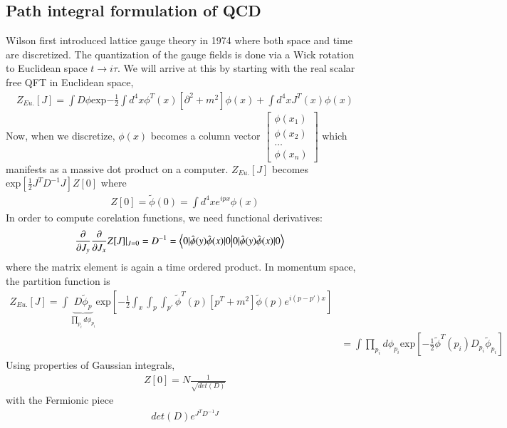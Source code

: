 \subsection{Path integral formulation of QCD}
Wilson \cite{Wilson:1974sk} first introduced lattice gauge theory in 1974 where both space and time are discretized. The quantization of the gauge fields is done via a Wick rotation to Euclidean space $t\rightarrow i\tau$. We will arrive at this by starting with the real scalar free QFT in Euclidean space,
\begin{align}
    Z_{Eu.}[J] = \int D\phi \text{exp}{-\frac{1}{2} \int d^4x \phi^T(x)[\partial^2 +m^2] \phi(x) + \int d^4xJ^T(x)\phi(x)} 
\end{align}  
Now, when we discretize, $\phi(x)$ becomes a column vector 
$\begin{bmatrix}
    \phi(x_1) \\
    \phi(x_2) \\
    \dots \\
    \phi(x_n)
\end{bmatrix} $
which manifests as a massive dot product on a computer. 
$Z_{Eu.}[J]$ becomes $\text{exp}[\frac{1}{2}J^T D^{-1}J] Z[0]$ where
\begin{align}
    Z[0] = \tilde{\phi}(0) = \int d^4x e^{ipx} \phi(x)
\end{align}
In order to compute corelation functions, we need functional derivatives: 
\begin{align}
    \frac{\partial}{\partial J_y} \frac{\partial}{\partial J_x} Z[J] \rvert_{J=0} = D^{-1} 
    &= \braket{0|{\hat{\phi}(y)\hat{\phi}(x)}|0}
\end{align}
where the matrix element is again a time ordered product. In momentum space, the partition function is 
\begin{align}
    Z_{Eu.}[J] = \int \underbrace{D\tilde{\phi}_p}_{\prod_{p_i} d\phi_{p_i}} \text{exp}[-\frac{1}{2} \int_x \int_p \int_{p'} \tilde{\phi}^T(p)[p^T +m^2] \tilde{\phi}(p) e^{i(p-p')x}] \\ 
    &= \int \prod_{p_i} d\phi_{p_i} \text{exp}[-\frac{1}{2}\tilde{\phi}^T(p_i)D_{p_i}\tilde{\phi}_{p_i}]
\end{align}
Using properties of Gaussian integrals, 
\begin{align}
    Z[0] = N \frac{1}{\sqrt{det(D)}}
\end{align}
with the Fermionic piece 
\begin{align}
    det(D) e^{J^TD^{-1}J}
\end{align}


